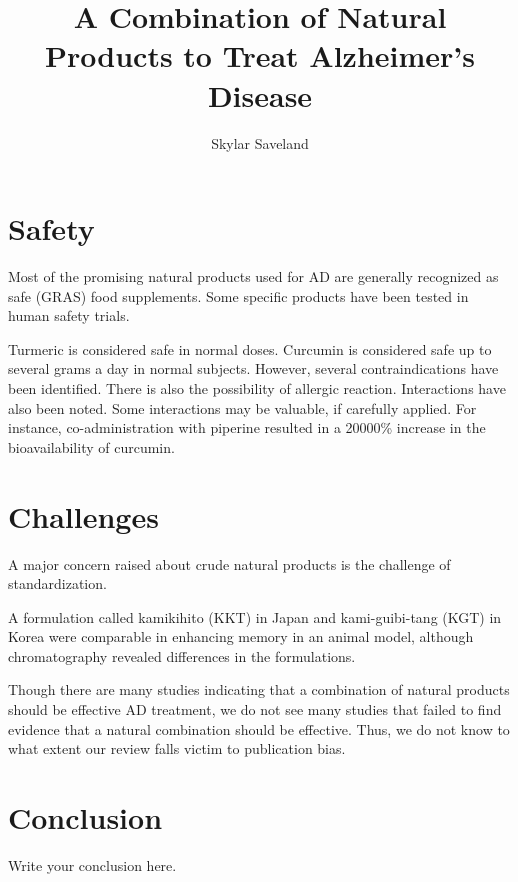 \documentclass[twocolumn]{article}
\begin{document}
\onecolumn
\title{A Combination of Natural Products to Treat Alzheimer's Disease}
\author{Skylar Saveland}

\maketitle

\newpage
\tableofcontents
\twocolumn















\section{Safety}

Most of the promising natural products used for AD
are generally recognized as safe (GRAS) food supplements.
Some specific products have been tested in human safety trials.



Turmeric is considered safe in normal doses.
Curcumin is considered safe up to several grams a day in normal subjects.
However, several contraindications have been identified.
There is also the possibility of allergic reaction.
Interactions have also been noted.
Some interactions may be valuable, if carefully applied.
For instance, co-administration with piperine resulted in a
20000\% increase in the bioavailability of curcumin.
\cite{mishra2008effect}







\section{Challenges}


A major concern raised about crude natural products is
the challenge of standardization.


A formulation called kamikihito (KKT) in Japan
and kami-guibi-tang (KGT) in Korea
were comparable in enhancing memory in an animal model,
although chromatography revealed differences in the formulations.
\cite{watari2015comparing}


Though there are many studies indicating that
a combination of natural products should be effective
AD treatment, we do not see many studies that
failed to find evidence that a natural combination
should be effective.
Thus, we do not know to what extent our review falls victim
to publication bias.







\section{Conclusion}
Write your conclusion here.
















\end{document}
